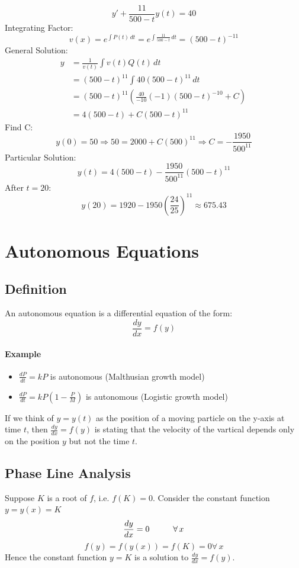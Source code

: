 \documentclass[12pt]{article}
\newcommand\tab[1][1cm]{\hspace*{#1}}
\begin{document}
\[
    y' + \frac{11}{500 - t} y(t) = 40
\]
Integrating Factor:
\[
    v(x) = e^{\int P(t) \, dt} = e^{\int \frac{11}{500 - t} \, dt} = (500 - t)^{ - 11} 
\]
General Solution:
\begin{align*} 
     y &= \frac{1}{v(t)} \int v(t)Q(t) \, dt \\
     &= (500 - t)^{11} \int 40(500 - t)^{11} \, dt \\
     &= (500 - t)^{11} \left( \frac{40}{ - 10} ( - 1) (500 - t)^{ - 10} + C \right)\, \\
     &= 4(500 - t) + C(500 - t)^{11}
\end{align*}
Find C:
\[
    y(0) = 50 \Rightarrow 50 = 2000 + C(500)^{11} \Rightarrow C = - \frac{1950}{500^11}
\]
Particular Solution:
\[
    y(t) =  4(500 - t) - \frac{1950}{500^11}(500 - t)^{11}
\]
After $t = 20$:
\[
    y(20) = 1920 - 1950(\frac{24}{25})^{11} \approx 675.43
\]
\section{Autonomous Equations}
\subsection{Definition}
An autonomous equation is a differential equation of the form:
\[
    \frac{dy}{dx} = f(y)
\]

\paragraph{Example}
\begin{itemize} 
    \item $\frac{dP}{dt} = kP$ is autonomous (Malthusian growth model)
    \item $\frac{dP}{dt} = kP\left( 1- \frac{P}{M} \right)$ is autonomous (Logistic growth model)
\end{itemize}
If we think of $y = y(t)$ as the position of a moving particle on the y-axis at time $t$, then $\frac{dy}{dx} = f(y)$ is stating that
the velocity of the vartical depends only on the position $y$ but not the time $t$.
\subsection{Phase Line Analysis}
Suppose $K$ is a root of $f$, i.e. $f(K) = 0$. Consider the constant function $y = y(x) = K$
\[
    \frac{dy}{dx} = 0 \textrm{\tab} \forall \, x
\]
\[
    f(y) = f(y(x)) = f(K) = 0 \forall \, x
\]
Hence the constant function $y = K$ is a solution to $\frac{dy}{dx} = f(y)$.
\end{document}
